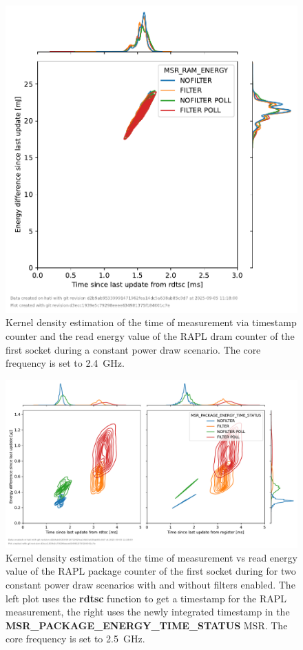 \begin{figure}[]
    \centering
    \includegraphics[width=0.54\columnwidth]{fig/rapl-update-intervals/MSR_RAM_ENERGY_2400000.pdf}
    \caption{Kernel density estimation of the time of measurement via timestamp counter and the read energy value of the RAPL dram counter of the first socket during a constant power draw scenario.
    The core frequency is set to \SI{2.4}{\GHz}.}
\end{figure}

\clearpage
\begin{figure}[]
    \centering
    \includegraphics[width=\columnwidth]{fig/rapl-update-intervals/MSR_PACKAGE_ENERGY_TIME_STATUS_2500000.pdf}
    \caption{Kernel density estimation of the time of measurement vs read energy value of the RAPL package counter of the first socket during for two constant power draw scenarios with and without filters enabled.
    The left plot uses the \textbf{rdtsc} function to get a timestamp for the RAPL measurement, the right uses the newly integrated timestamp in the \textbf{MSR\_PACKAGE\_ENERGY\_TIME\_STATUS} MSR.
    The core frequency is set to \SI{2.5}{\GHz}.}
\end{figure}

